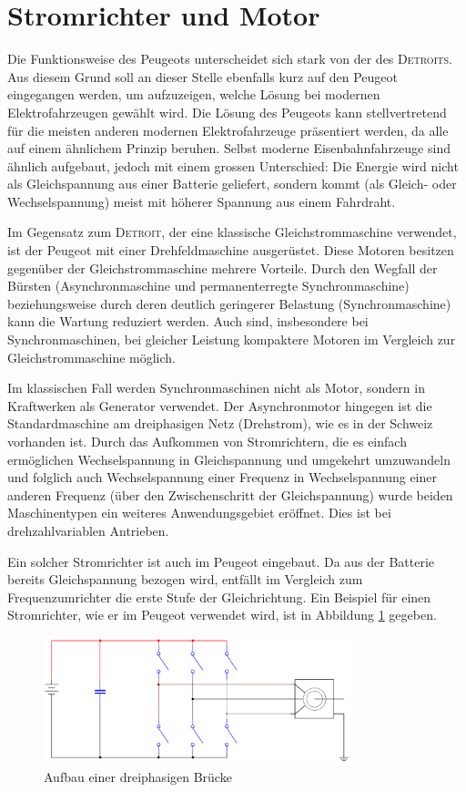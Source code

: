 \section{Stromrichter und Motor}
Die Funktionsweise des Peugeots unterscheidet sich stark von der des \textsc{Detroits}. Aus diesem Grund soll an dieser Stelle ebenfalls kurz auf den Peugeot eingegangen werden, um aufzuzeigen, welche Lösung bei modernen Elektrofahrzeugen gewählt wird. Die Lösung des Peugeots kann stellvertretend für die meisten anderen modernen Elektrofahrzeuge präsentiert werden, da alle auf einem ähnlichem Prinzip beruhen. Selbst moderne Eisenbahnfahrzeuge sind ähnlich aufgebaut, jedoch mit einem grossen Unterschied: Die Energie wird nicht als Gleichspannung aus einer Batterie geliefert, sondern kommt (als Gleich- oder Wechselspannung) meist mit höherer Spannung aus einem Fahrdraht.

Im Gegensatz zum \textsc{Detroit}, der eine klassische Gleichstrommaschine verwendet, ist der Peugeot mit einer Drehfeldmaschine ausgerüstet. Diese Motoren besitzen gegenüber der Gleichstrommaschine mehrere Vorteile. Durch den Wegfall der Bürsten (Asynchronmaschine und permanenterregte Synchronmaschine) beziehungsweise durch deren deutlich geringerer Belastung (Synchronmaschine) kann die Wartung reduziert werden. Auch sind, insbesondere bei Synchronmaschinen, bei gleicher Leistung kompaktere Motoren im Vergleich zur Gleichstrommaschine möglich.

Im klassischen Fall werden Synchronmaschinen nicht als Motor, sondern in Kraftwerken als Generator verwendet. Der Asynchronmotor hingegen ist die Standardmaschine am dreiphasigen Netz (Drehstrom), wie es in der Schweiz vorhanden ist. Durch das Aufkommen von Stromrichtern, die es einfach ermöglichen Wechselspannung in Gleichspannung und umgekehrt umzuwandeln und folglich auch Wechselspannung einer Frequenz in Wechselspannung einer anderen Frequenz (über den Zwischenschritt der Gleichspannung) wurde beiden Maschinentypen ein weiteres Anwendungsgebiet eröffnet. Dies ist bei drehzahlvariablen Antrieben.

Ein solcher Stromrichter ist auch im Peugeot eingebaut. Da aus der Batterie bereits Gleichspannung bezogen wird, entfällt im Vergleich zum Frequenzumrichter die erste Stufe der Gleichrichtung. Ein Beispiel für einen Stromrichter, wie er im Peugeot verwendet wird, ist in Abbildung \ref{fig:Bruecke} gegeben.

\begin{figure}[h!]
	\centering
		\includegraphics[width=0.80\textwidth]{images/Bruecke.PNG}
	\caption{Aufbau einer dreiphasigen Brücke}
	\label{fig:Bruecke}
\end{figure}

